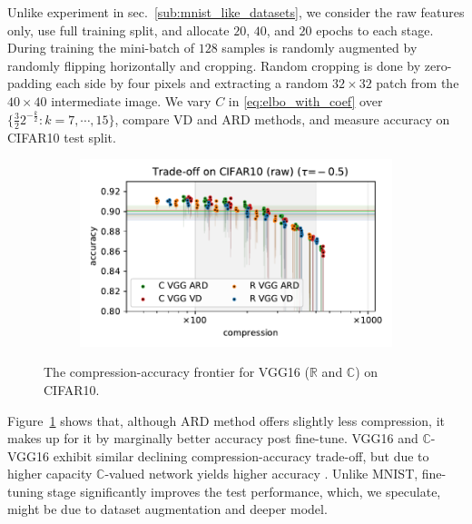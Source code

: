 \documentclass[a4paper,10pt,twocolumn]{article}
\newcommand{\real}{\mathbb{R}}
\newcommand{\cplx}{\mathbb{C}}
\begin{document}
Unlike experiment in sec.~\ref{sub:mnist_like_datasets}, we consider the raw features only,
use full training split, and allocate $20$, $40$, and $20$ epochs to each stage. During training
the mini-batch of $128$ samples is randomly augmented by randomly flipping horizontally and
cropping. Random cropping is done by zero-padding each side by four pixels and extracting a
random $32\times 32$ patch from the $40\times 40$ intermediate image.
%
We vary $C$ in \eqref{eq:elbo_with_coef} over $
  \{\tfrac32 2^{-\tfrac{k}2} \colon k=7, \cdots, 15\}
$, compare VD and ARD methods, and measure accuracy on CIFAR10 test split.

\begin{figure}[!t]
  \centering
  \begin{subfigure}[b]{1.\columnwidth}  %
    \includegraphics[width=\columnwidth]{figure__cifar__trade-off/appendix__augmentedcifar10__raw__-0.5.pdf}
  \end{subfigure}
  \caption{%
    The compression-accuracy frontier for VGG16 ($\real$ and $\cplx$) on CIFAR10.
  }
  \label{fig:figure__cifar10__trade-off}
\end{figure}

Figure~\ref{fig:figure__cifar10__trade-off} shows that, although ARD method offers slightly
less compression, it makes up for it by marginally better accuracy post fine-tune. VGG16 and
$\cplx$-VGG16 exhibit similar declining compression-accuracy trade-off, but due to higher
capacity $\cplx$-valued network yields higher accuracy \citep{monning_evaluation_2018}. Unlike
MNIST, fine-tuning stage significantly improves the test performance, which, we speculate, might
be due to dataset augmentation and deeper model.
\end{document}
